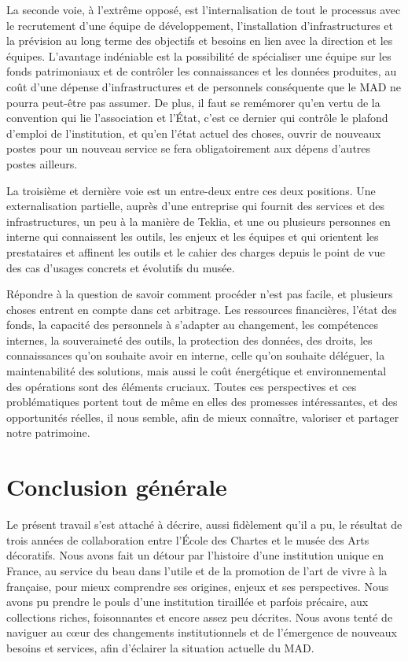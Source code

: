 La seconde voie, à l'extrême opposé, est l'internalisation de tout le processus avec le recrutement d'une équipe de développement, l'installation d'infrastructures et la prévision au long terme des objectifs et besoins en lien avec la direction et les équipes. L'avantage indéniable est la possibilité de spécialiser une équipe sur les fonds patrimoniaux et de contrôler les connaissances et les données produites, au coût d'une dépense d'infrastructures et de personnels conséquente que le MAD ne pourra peut-être pas assumer. De plus, il faut se remémorer qu'en vertu de la convention qui lie l'association et l'État, c'est ce dernier qui contrôle le plafond d'emploi de l'institution, et qu'en l'état actuel des choses, ouvrir de nouveaux postes pour un nouveau service se fera obligatoirement aux dépens d'autres postes ailleurs. 

La troisième et dernière voie est un entre-deux entre ces deux positions. Une externalisation partielle, auprès d'une entreprise qui fournit des services et des infrastructures, un peu à la manière de Teklia, et une ou plusieurs personnes en interne qui connaissent les outils, les enjeux et les équipes et qui orientent les prestataires et affinent les outils et le cahier des charges depuis le point de vue des cas d'usages concrets et évolutifs du musée.

Répondre à la question de savoir comment procéder n'est pas facile, et plusieurs choses entrent en compte dans cet arbitrage. Les ressources financières, l'état des fonds, la capacité des personnels à s'adapter au changement, les compétences internes, la souveraineté des outils, la protection des données, des droits, les connaissances qu'on souhaite avoir en interne, celle qu'on souhaite déléguer, la maintenabilité des solutions, mais aussi le coût énergétique et environnemental des opérations sont des éléments cruciaux. Toutes ces perspectives et ces problématiques portent tout de même en elles des promesses intéressantes, et des opportunités réelles, il nous semble, afin de mieux connaître, valoriser et partager notre patrimoine. 

\chapter*{Conclusion générale}

Le présent travail s'est attaché à décrire, aussi fidèlement qu'il a pu, le résultat de trois années de collaboration entre l'École des Chartes et le musée des Arts décoratifs. Nous avons fait un détour par l'histoire d'une institution unique en France, au service du beau dans l'utile et de la promotion de l'art de vivre à la française, pour mieux comprendre ses origines, enjeux et ses perspectives. Nous avons pu prendre le pouls d'une institution tiraillée et parfois précaire, aux collections riches, foisonnantes et encore assez peu décrites. Nous avons tenté de naviguer au cœur des changements institutionnels et de l'émergence de nouveaux besoins et services, afin d'éclairer la situation actuelle du MAD. 

